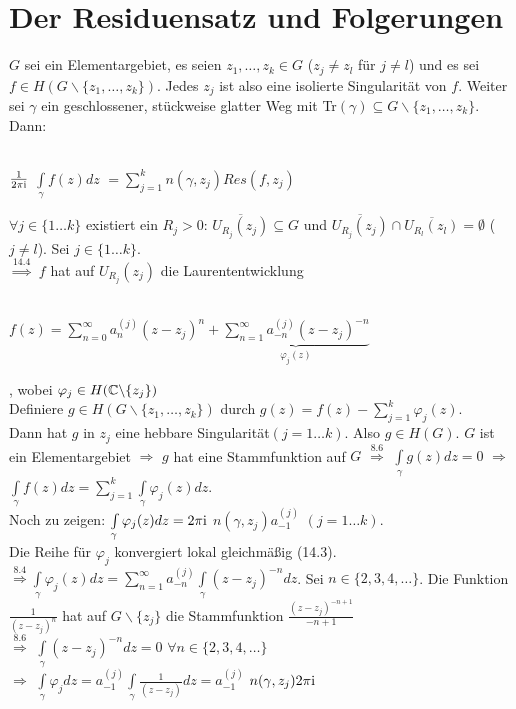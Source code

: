 \documentclass[a4paper,twoside,DIV15,BCOR12mm]{scrbook}
\def\wegint{\ensuremath{\int\limits_\gamma}}
\def\ie{\rm i}
\begin{document}
\chapter{Der Residuensatz und Folgerungen} 

\begin{satz}[Residuensatz]
  $G$ sei ein Elementargebiet, es seien $z_1, \ldots, z_k \in G$ ($z_j \neq z_l$ f\"ur
   $j \neq l$) und es sei $f \in H(G \backslash \{z_1, \ldots, z_k\})$. Jedes $z_j$
  ist also eine isolierte Singularit\"at von $f$. Weiter sei $\gamma$ ein
  geschlossener, st\"uckweise glatter Weg mit Tr$(\gamma) \subseteq G \backslash
  \{z_1, \ldots, z_k\}$. \\
  Dann: \\ \\
  \centerline{$\frac{1}{2 \pi \ie}$ 
  $ \int\limits_{\gamma} f(z) dz $
  $= \sum\limits_{j=1}^k n(\gamma, z_j) Res(f, z_j)$ }
\end{satz}
\begin{beweis}
  $\forall j \in \{1 \ldots k\}$ existiert ein $R_j > 0$: 
  $\overline{U_{R_j}(z_j)} \subseteq G$  
  und $\overline{U_{R_j}(z_j)} \cap \overline{U_{R_l}(z_l)} = \emptyset$ ($j \neq l$).
  Sei $j \in \{1\ldots k\}$. \\
  $\stackrel{\text{14.4}}{\Rightarrow} $ $f$ hat auf $U_{R_j}(z_j)$ die 
  Laurententwicklung \\ \\ \centerline{$f(z) = \sum\limits_{n=0}^{\infty}
  a_n^{(j)}(z-z_j)^n + 
  \underbrace{\sum\limits_{n=1}^{\infty}
  a_{-n}^{(j)}(z-z_j)^{-n}}_{\varphi_j(z)}$}, wobei $\varphi_j \in H(\mathbb{C}
  \backslash \{z_j \})$ \\ 
  Definiere $g \in H(G \backslash \{z_1,\ldots, z_k\})$ durch $g(z) = f(z) -
  \sum\limits_{j=1}^{k} \varphi_j(z)$. \\
  Dann hat $g$ in $z_j$ eine hebbare Singularit\"at$(j = 1\ldots k)$. Also $g \in
  H(G)$. $G$ ist ein Elementargebiet $\Rightarrow$ $g$ hat eine Stammfunktion auf
  $G$ $\stackrel{\text{8.6}}{\Rightarrow}$ $\int\limits_{\gamma} g(z)  dz = 0$
  $\Rightarrow$ $\wegint f(z) dz = \sum\limits_{j=1}^k \wegint \varphi_j(z) dz$.\\
  Noch zu zeigen: $\wegint  \varphi_j(z) dz = 2 \pi \ie $ $ n(\gamma, z_j)
  a_{-1}^{(j)}$ $(j = 1\ldots k)$. \\
  Die Reihe f\"ur $\varphi_j$ konvergiert lokal gleichm\"a{\ss}ig (14.3). \\
  $\stackrel{\text{8.4}}{\Rightarrow} \wegint \varphi_j(z) dz = \sum\limits_{n=1}^{\infty}
  a_{-n}^{(j)} \wegint (z-z_j)^{-n} dz$. Sei $n \in \{2,3,4, \ldots\}$. Die
  Funktion $\frac{1}{(z-z_j)^n}$ hat auf $G \backslash \{z_j\}$ die Stammfunktion
  $\frac{(z-z_j)^{-n+1}}{-n+1}$ \\ $\stackrel{8.6}{\Rightarrow}$ $\wegint
  (z-z_j)^{-n} dz = 0$ $\forall n \in \{2,3,4,\ldots\}$ \\ $\Rightarrow$ $\wegint
  \varphi_j dz = a_{-1}^{(j)} \wegint \frac{1}{(z-z_j)} dz = a_{-1}^{(j)}$
  $n(\gamma, z_j) 2 \pi \ie$
\end{beweis}
\end{document}
